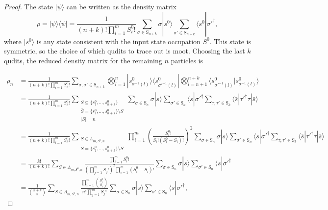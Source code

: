 \begin{proof}
The state $|\psi\rangle$ can be written as the density matrix
\begin{equation}
\rho = |\psi\rangle\langle\psi| = \frac{1}{(n+k)!\prod_{i=1}^m S^0_i!} \sum_{\sigma\in\textrm{S}_{n+k}}\sigma|s^0\rangle\sum_{\sigma'\in\textrm{S}_{n+k}}\langle s^0|\sigma'^\dagger,
\end{equation}
where $|s^0\rangle$ is any state consistent with the input state occupation $S^0$.
This state is symmetric, so the choice of which qudits to trace out is moot.
Choosing the last $k$ qudits, the reduced density matrix for the remaining $n$ particles is

\begin{align}
\rho_n
 &= \frac{1}{(n+k)!\prod_{i=1}^m S^0_i!}\sum_{\sigma,\sigma'\in\textrm{S}_{n+k}}\bigotimes_{l=1}^n|s^0_{\sigma^{-1}(l)}\rangle\langle s^0_{\sigma'^{-1}(l)}|\bigotimes_{l=n+1}^{n+k}\langle s^0_{\sigma'^{-1}(l)}|s^0_{\sigma^{-1}(l)}\rangle\label{eqn:losstrace}\\
 &=\frac{1}{(n+k)!\prod_{i=1}^m S^0_i!}\sum_{\substack{S \subseteq \{s^0_1,\dots,s^0_{n+k}\}\\\bar{S}=\{s^0_1,\dots,s^0_{n+k}\}\setminus{S}\\|S|=n}}\sum_{\sigma \in \textrm{S}_{n}}\sigma|s\rangle\sum_{\sigma' \in \textrm{S}_{n}}\langle s|\sigma'^\dagger\sum_{\tau,\tau'\in\textrm{S}_k}\langle \bar{s}|\tau'^\dagger\tau|\bar{s}\rangle\label{eqn:firstloss}\\
 &=\frac{1}{(n+k)!\prod_{i=1}^m S^0_i!}\sum_{\substack{S \in \Lambda_{m,S^0,n}\\\bar{S}=\{s^0_1,\dots,s^0_{n+k}\}\setminus{S}}}\prod_{i=1}^m\left(\frac{S^0_i!}{S_i!(S_i^0-S_i)!}\right)^2\sum_{\sigma \in \textrm{S}_{n}}\sigma|s\rangle\sum_{\sigma' \in \textrm{S}_{n}}\langle s|\sigma'^\dagger\sum_{\tau,\tau'\in\textrm{S}_k}\langle \bar{s}|\tau'^\dagger\tau|\bar{s}\rangle\label{eqn:secondloss}\\
 &=\frac{k!}{(n+k)!}\sum_{S \in \Lambda_{m,S^0,n}}\frac{\prod_{i=1}^m S^0_i!}{(\prod_{j=1}^m S_j!)^2\prod_{i=1}^m (S^0_i-S_i)!}\sum_{\sigma \in \textrm{S}_{n}}\sigma|s\rangle\sum_{\sigma' \in \textrm{S}_{n}}\langle s|\sigma'^\dagger\label{eqn:thirdloss}\\
 &=\frac{1}{\binom{n+k}{n}}\sum_{S \in \Lambda_{m,S^0,n}}\frac{\prod_{i=1}^m \binom{S_i^0}{S_i}}{n!\prod_{j=1}^m S_j!}\sum_{\sigma \in \textrm{S}_{n}}\sigma|s\rangle\sum_{\sigma' \in \textrm{S}_{n}}\langle s|\sigma'^\dagger , \label{eq:lastloss}
\end{align}

\end{proof}
